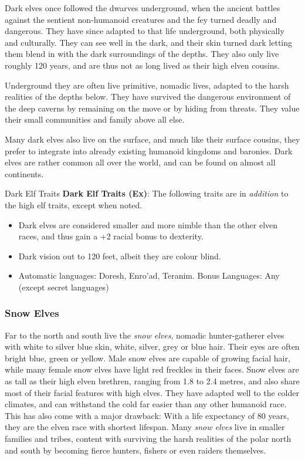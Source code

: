 Dark elves once followed the dwarves underground, when the ancient battles
against the sentient non-humanoid creatures and the fey turned deadly and
dangerous. They have since adapted to that life underground, both physically
and culturally. They can see well in the dark, and their skin turned dark
letting them blend in with the dark surroundings of the depths. They also only
live roughly 120 years, and are thus not as long lived as their high elven
cousins.

Underground they are often live primitive, nomadic lives, adapted to the harsh
realities of the depths below. They have survived the dangerous environment of
the deep caverns by remaining on the move or by hiding from threats. They
value their small communities and family above all else.

Many dark elves also live on the surface, and much like their surface cousins,
they prefer to integrate into already existing humanoid kingdoms and baronies.
Dark elves are rather common all over the world, and can be found on almost all
continents.

\begin{35e}{Dark Elf Traits}
  \textbf{Dark Elf Traits (Ex)}: The following traits are in \emph{addition}
  to the high elf traits, except when noted.
  \begin{itemize}[noitemsep]
    \item Dark elves are considered smaller and more nimble than the other
      elven races, and thus gain a +2 racial bonus to dexterity.
    \item Dark vision out to 120 feet, albeit they are colour blind.
    \item Automatic languages: Doresh, Enro'ad, Teranim. Bonus Languages: Any
      (except secret languages)
  \end{itemize}
\end{35e}

\subsubsection{Snow Elves}
\label{sec:Snow Elves}


Far to the north and south live the \emph{snow elves}, nomadic hunter-gatherer
elves with white to silver blue skin, white, silver, grey or blue hair. Their
eyes are often bright blue, green or yellow. Male snow elves are capable of
growing facial hair, while many female snow elves have light red freckles
in their faces. Snow elves are as tall as their high elven brethren, ranging
from 1.8 to 2.4 metres, and also share most of their facial features with high
elves. They have adapted well to the colder climates, and can withstand the
cold far easier than any other humanoid race. This has also come with a major
drawback: With a life expectancy of 80 years, they are the elven race with
shortest lifespan. Many \emph{snow elves} live in smaller families and tribes,
content with surviving the harsh realities of the polar north and south by
becoming fierce hunters, fishers or even raiders themselves.

